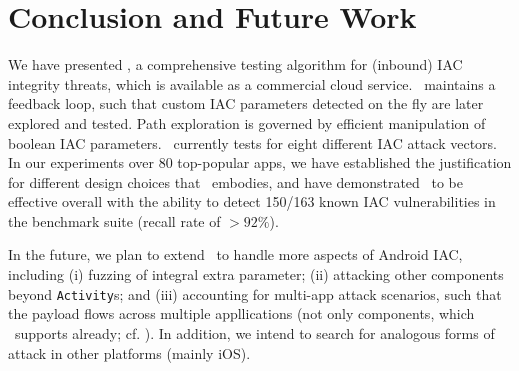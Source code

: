 \section{Conclusion and Future Work}\label{Se:conclusion}

We have presented \Tool, a comprehensive testing algorithm for (inbound) IAC integrity threats, which is available as a commercial cloud service. \Tool\
maintains a feedback loop, such that custom IAC parameters detected on the fly are later explored and tested. Path exploration is governed by efficient manipulation of boolean IAC parameters. \Tool\ currently tests for eight different IAC attack vectors. In our experiments over 80 top-popular apps, we have established the justification for different design choices that \Tool\ embodies, and have demonstrated \Tool\ to be effective overall with the ability to detect 150/163 known IAC vulnerabilities in the benchmark suite (recall rate of $>92\%$).

In the future, we plan to extend \Tool\ to handle more aspects of Android IAC, including (i) fuzzing of integral extra parameter; (ii) attacking other components beyond {\tt Activity}s; and (iii) accounting for multi-app attack scenarios, such that the payload flows across multiple appllications (not only components, which \Tool\ supports already; cf. \cite{RALB:ARES14}). In addition, we intend to search for analogous forms of attack in other platforms (mainly iOS).


